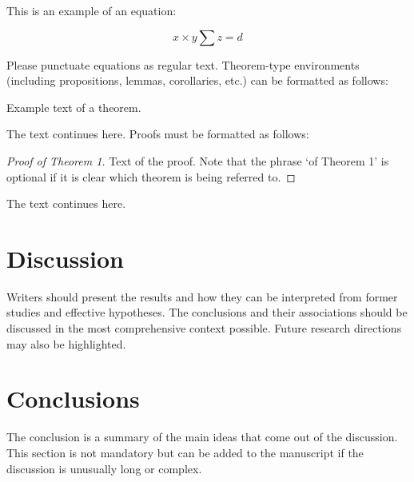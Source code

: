 \documentclass[SCMIJ,viewpoint ,submit,moreauthors,pdftex]{Files/scmij}
\begin{document}
This is an example of an equation:

\begin{equation}
x \times y \sum z = d
\end{equation}

Please punctuate equations as regular text. Theorem-type environments (including propositions, lemmas, corollaries, etc.) can be formatted as follows:
\begin{Theorem}
Example text of a theorem.
\end{Theorem}

The text continues here. Proofs must be formatted as follows:

\begin{proof}[Proof of Theorem 1]
Text of the proof. Note that the phrase `of Theorem 1' is optional if it is clear which theorem is being referred to.
\end{proof}
The text continues here.


\section{Discussion}

Writers should present the results and how they can be interpreted from former studies and effective hypotheses. The conclusions and their associations should be discussed in the most comprehensive context possible. Future research directions may also be highlighted.


\section{Conclusions}

The conclusion is a summary of the main ideas that come out of the discussion. This section is not mandatory but can be added to the manuscript if the discussion is unusually long or complex.


\vspace{6pt} 





\appendix
\section{}
\unskip
\end{document}
